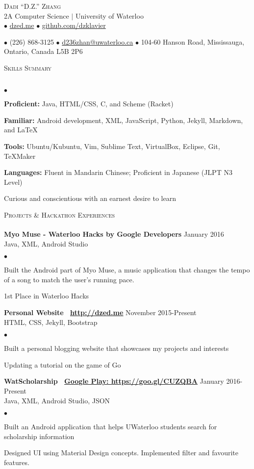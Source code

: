 \documentclass{article}
\newcommand{\lineunder}{\vspace*{-8pt} \\ \hspace*{-18pt} \hrulefill \\}
\newcommand{\header}[1]{{\hspace*{-15pt}\vspace*{6pt} \textsc{#1}} \vspace*{-6pt} \lineunder}
\newcommand{\employer}[3]{{ \textbf{#1} \hfill #2\\ {#3}\\  }}
\newcommand{\contact}[3]{
\begin{center}
{}
\end{center}
\vspace*{-8pt}
\begin{center}
{\LARGE \scshape {#1}}\\
#2\\
#3
\end{center}
\vspace*{-8pt}
}
\newenvironment{achievements}{\begin{list}{$\bullet$}{\topsep 0pt \itemsep -2pt}}{\vspace*{4pt}\end{list}}
\begin{document}
\small
\smallskip
\vspace*{-44pt}

\contact{Dadi ``D.Z.'' Zhang}
{2A Computer Science $\vert$ University of Waterloo}
{$\bullet$ \href{http://dzed.me}{dzed.me}
$\bullet$ \href{http://github.com/dzklavier}{github.com/dzklavier}}
{$\bullet$ (226) 868-3125
$\bullet$ \href{mailto:d236zhan@uwaterloo.ca}{d236zhan@uwaterloo.ca}
$\bullet$ 104-60 Hanson Road, Mississauga, Ontario, Canada L5B 2P6}

\hfill \break
\header{Skills Summary}
\begin{achievements}
\item \textbf{Proficient:} Java, HTML/CSS, C, and Scheme (Racket)
\item \textbf{Familiar:} Android development, XML, JavaScript, Python, Jekyll, Markdown, and  \LaTeX\
\item \textbf{Tools:} Ubuntu/Kubuntu, Vim, Sublime Text, VirtualBox, Eclipse, Git, TeXMaker
\item \textbf{Languages:} Fluent in Mandarin Chinese; Proficient in Japanese (JLPT N3 Level)
\item Curious and conscientious with an earnest desire to learn 
\end{achievements}

\header{Projects \& Hackathon Experiences}

\employer{Myo Muse - Waterloo Hacks by Google Developers}{January 2016}{Java, XML, Android Studio}
	\begin{achievements}
	\item Built the Android part of Myo Muse, a music application that changes the tempo of a song to match the user's running pace.
	\item 1st Place in Waterloo Hacks
	\end{achievements}
	
\employer{Personal Website \hspace{5pt} \Mundus~\href{http://dzed.me}{\underline{http://dzed.me}}}{November 2015-Present}{HTML, CSS, Jekyll, Bootstrap}
	\begin{achievements}
	\item Built a personal blogging website that showcases my projects and interests
	\item Updating a tutorial on the game of Go 
	\end{achievements}
	
\employer{WatScholarship \hspace{5pt} \Mundus~\href{https://goo.gl/CUZQBA}{Google Play: \underline{https://goo.gl/CUZQBA}}}{January 2016-Present}{Java, XML, Android Studio, JSON}
	\begin{achievements}
	\item Built an Android application that helps UWaterloo students search for scholarship information
	\item Designed UI using Material Design concepts. Implemented filter and favourite features.
	\end{achievements}
\end{document}
